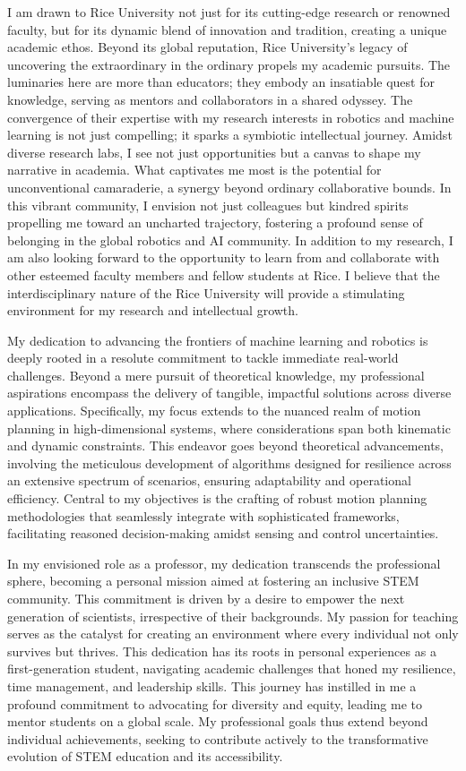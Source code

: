 \documentclass[a4,20pt]{article}
\begin{document}
\begin{large}
I am drawn to Rice University not just for its cutting-edge research or renowned faculty, but for its dynamic blend of innovation and tradition, creating a unique academic ethos. Beyond its global reputation, Rice University's legacy of uncovering the extraordinary in the ordinary propels my academic pursuits. The luminaries here are more than educators; they embody an insatiable quest for knowledge, serving as mentors and collaborators in a shared odyssey. The convergence of their expertise with my research interests in robotics and machine learning is not just compelling; it sparks a symbiotic intellectual journey. Amidst diverse research labs, I see not just opportunities but a canvas to shape my narrative in academia. What captivates me most is the potential for unconventional camaraderie, a synergy beyond ordinary collaborative bounds. In this vibrant community, I envision not just colleagues but kindred spirits propelling me toward an uncharted trajectory, fostering a profound sense of belonging in the global robotics and AI community. In addition to my research, I am also looking forward to the opportunity to learn from and collaborate with other esteemed faculty members and fellow students at Rice. I believe that the interdisciplinary nature of the Rice University will provide a stimulating environment for my research and intellectual growth.

My dedication to advancing the frontiers of machine learning and robotics is deeply rooted in a resolute commitment to tackle immediate real-world challenges. Beyond a mere pursuit of theoretical knowledge, my professional aspirations encompass the delivery of tangible, impactful solutions across diverse applications. Specifically, my focus extends to the nuanced realm of motion planning in high-dimensional systems, where considerations span both kinematic and dynamic constraints. This endeavor goes beyond theoretical advancements, involving the meticulous development of algorithms designed for resilience across an extensive spectrum of scenarios, ensuring adaptability and operational efficiency. Central to my objectives is the crafting of robust motion planning methodologies that seamlessly integrate with sophisticated frameworks, facilitating reasoned decision-making amidst sensing and control uncertainties.

In my envisioned role as a professor, my dedication transcends the professional sphere, becoming a personal mission aimed at fostering an inclusive STEM community. This commitment is driven by a desire to empower the next generation of scientists, irrespective of their backgrounds. My passion for teaching serves as the catalyst for creating an environment where every individual not only survives but thrives. This dedication has its roots in personal experiences as a first-generation student, navigating academic challenges that honed my resilience, time management, and leadership skills. This journey has instilled in me a profound commitment to advocating for diversity and equity, leading me to mentor students on a global scale. My professional goals thus extend beyond individual achievements, seeking to contribute actively to the transformative evolution of STEM education and its accessibility.



\end{large}
\end{document}
